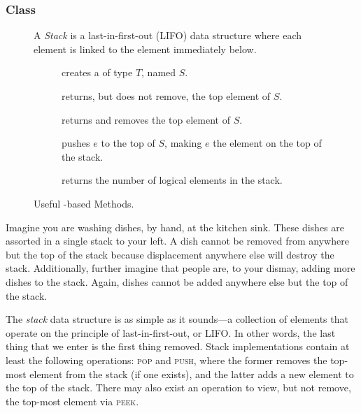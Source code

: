 \subsubsection*{ Class}
\begin{figure}[tp]
  \small
  \begin{tcolorbox}[title=Java Stacks]
    A \textit{Stack} is a last-in-first-out (LIFO) data structure where each element is linked to the element immediately below. 
    \vspace{2ex}
  \begin{description}
    \item [] creates a  of type $T$, named $S$.
    \item [] returns, but does not remove, the top element of $S$.
    \item [] returns and removes the top element of $S$.
    \item [] pushes $e$ to the top of $S$, making $e$ the element on the top of the stack.
    \item [] returns the number of logical elements in the stack.
  \end{description}
\end{tcolorbox}
  \caption{Useful -based Methods.}
  \label{fig:stacks}
\end{figure}
Imagine you are washing dishes, by hand, at the kitchen sink. These dishes are assorted in a single stack to your left. A dish cannot be removed from anywhere but the top of the stack because displacement anywhere else will destroy the stack. Additionally, further imagine that people are, to your dismay, adding more dishes to the stack. Again, dishes cannot be added anywhere else but the top of the stack. 

The \textit{stack} data structure is as simple as it sounds---a collection of elements that operate on the principle of last-in-first-out, or LIFO. In other words, the last thing that we enter is the first thing removed. Stack implementations contain at least the following operations: \textsc{pop} and \textsc{push}, where the former removes the top-most element from the stack (if one exists), and the latter adds a new element to the top of the stack. There may also exist an operation to view, but not remove, the top-most element via \textsc{peek}. 


